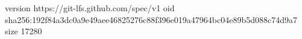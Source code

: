 version https://git-lfs.github.com/spec/v1
oid sha256:192f84a3dc0a9e49aee46825276c88f396e019a47964bc04e89b5d088c74d9a7
size 17280
